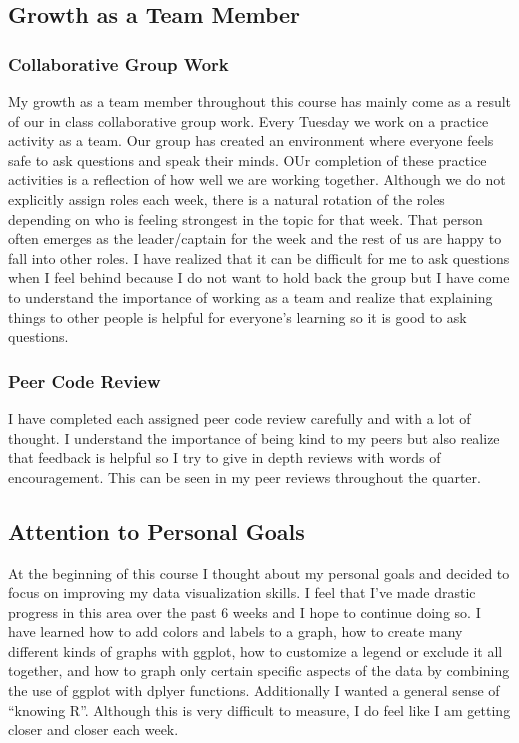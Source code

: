 \documentclass[
  letterpaper,
  DIV=11,
  numbers=noendperiod]{scrartcl}
\begin{document}
\hypertarget{growth-as-a-team-member}{%
\subsection{Growth as a Team Member}\label{growth-as-a-team-member}}

\hypertarget{collaborative-group-work}{%
\subsubsection{Collaborative Group
Work}\label{collaborative-group-work}}

My growth as a team member throughout this course has mainly come as a
result of our in class collaborative group work. Every Tuesday we work
on a practice activity as a team. Our group has created an environment
where everyone feels safe to ask questions and speak their minds. OUr
completion of these practice activities is a reflection of how well we
are working together. Although we do not explicitly assign roles each
week, there is a natural rotation of the roles depending on who is
feeling strongest in the topic for that week. That person often emerges
as the leader/captain for the week and the rest of us are happy to fall
into other roles. I have realized that it can be difficult for me to ask
questions when I feel behind because I do not want to hold back the
group but I have come to understand the importance of working as a team
and realize that explaining things to other people is helpful for
everyone's learning so it is good to ask questions.

\hypertarget{peer-code-review}{%
\subsubsection{Peer Code Review}\label{peer-code-review}}

I have completed each assigned peer code review carefully and with a lot
of thought. I understand the importance of being kind to my peers but
also realize that feedback is helpful so I try to give in depth reviews
with words of encouragement. This can be seen in my peer reviews
throughout the quarter.

\hypertarget{attention-to-personal-goals}{%
\subsection{Attention to Personal
Goals}\label{attention-to-personal-goals}}

At the beginning of this course I thought about my personal goals and
decided to focus on improving my data visualization skills. I feel that
I've made drastic progress in this area over the past 6 weeks and I hope
to continue doing so. I have learned how to add colors and labels to a
graph, how to create many different kinds of graphs with ggplot, how to
customize a legend or exclude it all together, and how to graph only
certain specific aspects of the data by combining the use of ggplot with
dplyer functions. Additionally I wanted a general sense of ``knowing
R''. Although this is very difficult to measure, I do feel like I am
getting closer and closer each week.
\end{document}

